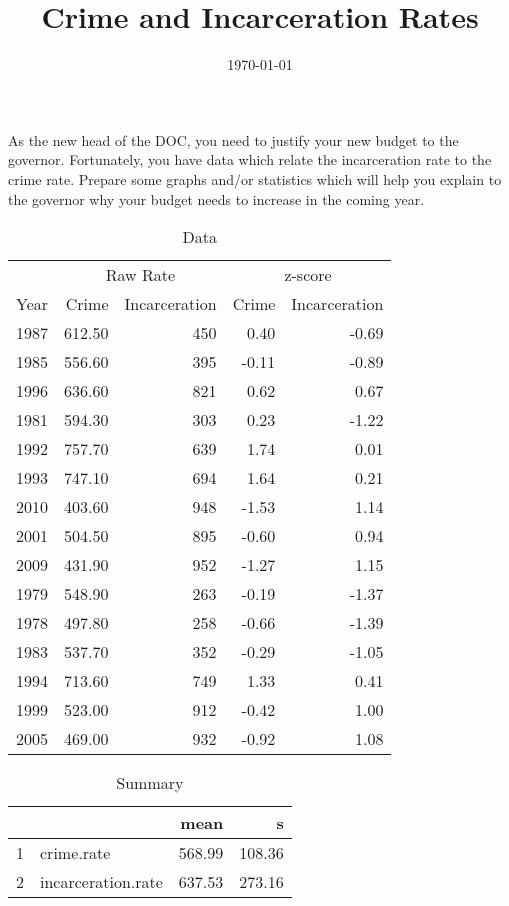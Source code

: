 \documentclass{exam}
\author{}
\title{Crime and Incarceration Rates}
\date{\today}
\begin{document}
  \maketitle

  As the new head of the DOC, you need to justify your new budget to the
  governor.  Fortunately, you have data which relate the incarceration rate to
  the crime rate.  Prepare some graphs and/or statistics which will help you
  explain to the governor why your budget needs to increase in the coming year.

  \begin{table}[H]
    \centering
    \begin{tabular}{rrrrr}
      \toprule
      & \multicolumn{2}{c}{Raw Rate} & \multicolumn{2}{c}{z-score } \\
      \cmidrule(r){2-3} \cmidrule(r){4-5} 
      Year & Crime  & Incarceration & Crime & Incarceration \\
      \midrule
      1987 & 612.50 & 450           & 0.40  & -0.69 \\
      1985 & 556.60 & 395           & -0.11 & -0.89 \\
      1996 & 636.60 & 821           & 0.62  & 0.67 \\
      1981 & 594.30 & 303           & 0.23  & -1.22 \\
      1992 & 757.70 & 639           & 1.74  & 0.01 \\
      1993 & 747.10 & 694           & 1.64  & 0.21 \\
      2010 & 403.60 & 948           & -1.53 & 1.14 \\
      2001 & 504.50 & 895           & -0.60 & 0.94 \\
      2009 & 431.90 & 952           & -1.27 & 1.15 \\
      1979 & 548.90 & 263           & -0.19 & -1.37 \\
      1978 & 497.80 & 258           & -0.66 & -1.39 \\
      1983 & 537.70 & 352           & -0.29 & -1.05 \\
      1994 & 713.60 & 749           & 1.33  & 0.41 \\
      1999 & 523.00 & 912           & -0.42 & 1.00 \\
      2005 & 469.00 & 932           & -0.92 & 1.08 \\
      \bottomrule
    \end{tabular}
    \caption{Data}
  \end{table}

  \begin{table}[ht]
    \centering
    \begin{tabular}{rlrr}
      \toprule
         &                    & mean   & s \\
      \midrule
      1  & crime.rate         & 568.99 & 108.36 \\
      2  & incarceration.rate & 637.53 & 273.16 \\
      \bottomrule
    \end{tabular}
    \caption{Summary}
  \end{table}
\end{document}
